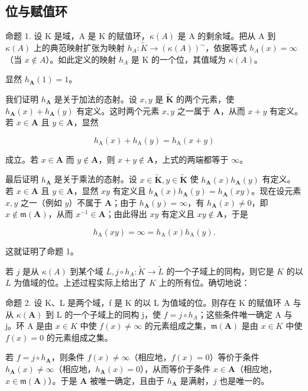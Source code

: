 \subsection{位与赋值环}

命题 1. 设 K 是域，A 是 K 的赋值环，\(\kappa(A)\) 是 A 的剩余域。把从 A 到 \(\kappa(A)\) 上的典范映射扩张为映射 \(h_{A}: \tilde{K} \to (\kappa(A))^{\sim}\)，依据等式 \(h_{A}(x) = \infty\)（当 \(x \notin A\)）。如此定义的映射 \(h_{A}\) 是 K 的一个位，其值域为 \(\kappa(A)\)。

显然 \(h_{\mathbf{A}}(1) = 1\)。

我们证明 \(h_{\mathbf{A}}\) 是关于加法的态射。设 \(x, y\) 是 \(\tilde{\mathbf{K}}\) 的两个元素，使 \(h_{\mathbf{A}}(x) + h_{\mathbf{A}}(y)\) 有定义。这时两个元素 \(x, y\) 之一属于 \(\mathbf{A}\)，从而 \(x + y\) 有定义。若 \(x \in \mathbf{A}\) 且 \(y \in \mathbf{A}\)，显然

\[
h _ {\mathrm{A}} (x) + h _ {\mathrm{A}} (y) = h _ {\mathrm{A}} (x + y)
\]

成立。若 \(x \in \mathbf{A}\) 而 \(y \notin \mathbf{A}\)，则 \(x + y \notin \mathbf{A}\)，上式的两端都等于 \(\infty\)。

最后证明 \(h_{\mathbf{A}}\) 是关于乘法的态射。设 \(x \in \tilde{\mathbf{K}}, y \in \tilde{\mathbf{K}}\) 使 \(h_{\mathbf{A}}(x)h_{\mathbf{A}}(y)\) 有定义。若 \(x \in \mathbf{A}\) 且 \(y \in \mathbf{A}\)，显然 \(xy\) 有定义且 \(h_{\mathbf{A}}(x)h_{\mathbf{A}}(y) = h_{\mathbf{A}}(xy)\)。现在设元素 \(x, y\) 之一（例如 \(y\)）不属于 \(\mathbf{A}\)；由于 \(h_{\mathbf{A}}(y) = \infty\)，有 \(h_{\mathbf{A}}(x) \neq 0\)，即 \(x \notin \mathfrak{m}(\mathbf{A})\)，从而 \(x^{-1} \in \mathbf{A}\)；由此得出 \(xy\) 有定义且 \(xy \notin \mathbf{A}\)，于是

\[
h _ {\mathrm{A}} (x y) = \infty = h _ {\mathrm{A}} (x) h _ {\mathrm{A}} (y).
\]

这就证明了命题 1。

若 \(j\) 是从 \(\kappa(A)\) 到某个域 \(L, j \circ h_{A}: \tilde{K} \to \tilde{L}\) 的一个子域上的同构，则它是 \(K\) 的以 \(L\) 为值域的位。上述过程实际上给出了 \(K\) 上的所有位。确切地说：

命题 2. 设 K、L 是两个域，f 是 K 的以 L 为值域的位。则存在 K 的赋值环 A 与从 \(\kappa(\mathbf{A})\) 到 L 的一个子域上的同构 j，使 \(f = j \circ h_{A}\)；这些条件唯一确定 A 与 j。环 A 是由 \(x \in K\) 中使 \(f(x) \neq \infty\) 的元素组成之集，\(\mathfrak{m}(\mathbf{A})\) 是由 \(x \in K\) 中使 \(f(x) = 0\) 的元素组成之集。

若 \(f = j \circ h_{\mathbf{A}}\)，则条件 \(f(x) \neq \infty\)（相应地，\(f(x) = 0\)）等价于条件 \(h_{\mathbf{A}}(x) \neq \infty\)（相应地，\(h_{\mathbf{A}}(x) = 0\)），从而等价于条件 \(x \in \mathbf{A}\)（相应地，\(x \in \mathfrak{m}(\mathbf{A})\)）。于是 \(\mathbf{A}\) 被唯一确定，且由于 \(h_{\mathbf{A}}\) 是满射，\(j\) 也是唯一的。

